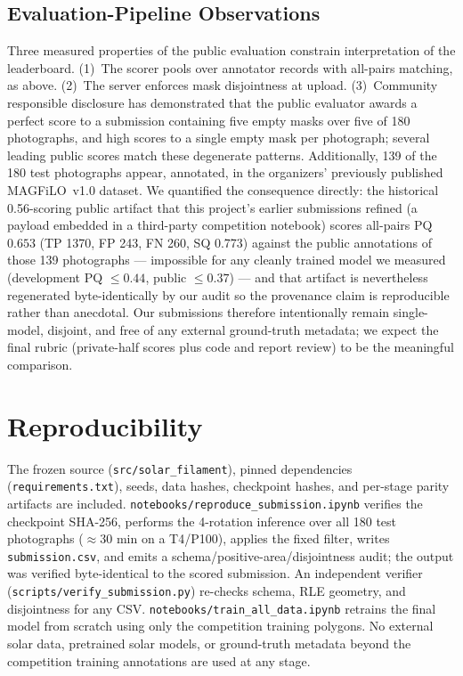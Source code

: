 \documentclass[conference]{IEEEtran}
\begin{document}
\subsection{Evaluation-Pipeline Observations}
Three measured properties of the public evaluation constrain interpretation of the
leaderboard. (1)~The scorer pools over annotator records with all-pairs matching, as
above. (2)~The server enforces mask disjointness at upload. (3)~Community responsible
disclosure has demonstrated that the public evaluator awards a perfect score to a
submission containing five empty masks over five of 180 photographs, and high scores
to a single empty mask per photograph; several leading public scores match these
degenerate patterns. Additionally, 139 of the 180 test photographs appear, annotated,
in the organizers' previously published MAGFiLO~v1.0 dataset. We quantified the
consequence directly: the historical 0.56-scoring public artifact that this project's
earlier submissions refined (a payload embedded in a third-party competition notebook)
scores all-pairs PQ $0.653$ (TP 1370, FP 243, FN 260, SQ 0.773) against the public
annotations of those 139 photographs --- impossible for any cleanly trained model we
measured (development PQ $\le 0.44$, public $\le 0.37$) --- and that artifact is
nevertheless regenerated byte-identically by our audit so the provenance claim is
reproducible rather than anecdotal. Our submissions
therefore intentionally remain single-model, disjoint, and free of any external
ground-truth metadata; we expect the final rubric (private-half scores plus code and
report review) to be the meaningful comparison.

\section{Reproducibility}
The frozen source (\texttt{src/solar\_filament}), pinned dependencies
(\texttt{requirements.txt}), seeds, data hashes, checkpoint hashes, and per-stage
parity artifacts are included. \texttt{notebooks/reproduce\_submission.ipynb} verifies
the checkpoint SHA-256, performs the 4-rotation inference over all 180 test
photographs ($\approx$30 min on a T4/P100), applies the fixed filter, writes
\texttt{submission.csv}, and emits a schema/positive-area/disjointness audit; the
output was verified byte-identical to the scored submission. An independent verifier
(\texttt{scripts/verify\_submission.py}) re-checks schema, RLE geometry, and
disjointness for any CSV.
\texttt{notebooks/train\_all\_data.ipynb} retrains the final model from scratch using
only the competition training polygons. No external solar data, pretrained solar
models, or ground-truth metadata beyond the competition training annotations are used
at any stage.
\end{document}
